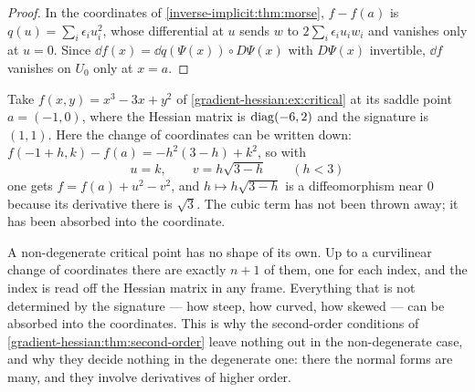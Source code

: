 \begin{notechapter}
\begin{proof}
In the coordinates of \cref{inverse-implicit:thm:morse}, $f - f(a)$ is
$q(u) = \sum_i\epsilon_iu_i^2$, whose differential at $u$ sends $w$ to
$2\sum_i\epsilon_iu_iw_i$ and vanishes only at $u = 0$. Since
$\dd f(x) = \dd q(\Psi(x))\circ D\Psi(x)$ with $D\Psi(x)$ invertible,
$\dd f$ vanishes on $U_0$ only at $x = a$.
\end{proof}

\begin{example}
\label{inverse-implicit:ex:morse}
Take $f(x, y) = x^3 - 3x + y^2$ of \cref{gradient-hessian:ex:critical}
at its saddle point $a = (-1, 0)$, where the Hessian matrix is
$\operatorname{diag}(-6, 2)$ and the signature is $(1, 1)$. Here the change of
coordinates can be written down: $f(-1 + h, k) - f(a) = -h^2(3 - h)
+ k^2$, so with
\[
  u = k , \qquad v = h\sqrt{3 - h} \qquad (h < 3)
\]
one gets $f = f(a) + u^2 - v^2$, and $h\mapsto h\sqrt{3 - h}$ is a
diffeomorphism near $0$ because its derivative there is $\sqrt3$. The
cubic term has not been thrown away; it has been absorbed into the
coordinate.
\end{example}

\begin{intuition}
A non-degenerate critical point has no shape of its own. Up to a
curvilinear change of coordinates there are exactly $n + 1$ of them, one
for each index, and the index is read off the Hessian matrix in any
frame. Everything that is not determined by the signature --- how steep,
how curved, how skewed --- can be absorbed into the coordinates. This is
why the second-order conditions of
\cref{gradient-hessian:thm:second-order} leave nothing out in the
non-degenerate case, and why they decide nothing in the degenerate one:
there the normal forms are many, and they involve derivatives of higher
order.
\end{intuition}


\end{notechapter}
